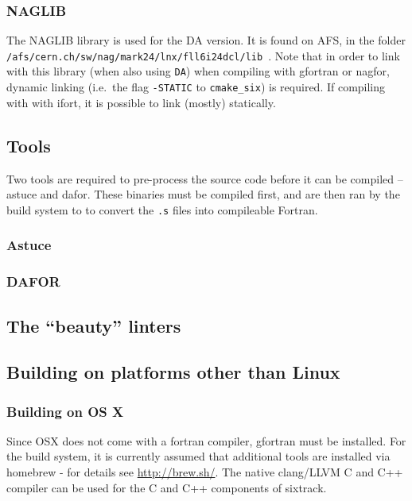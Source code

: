 \documentclass[english,BCOR=0mm,DIV=18]{scrartcl}
\begin{document}
\subsubsection{NAGLIB}
\label{sec:building:libs:naglib}
The NAGLIB library  is used for the DA version.
It is found on AFS, in the folder \texttt{/afs/cern.ch/sw/nag/mark24/lnx/fll6i24dcl/lib}~.
Note that in order to link with this library (when also using \texttt{DA}) when compiling with gfortran or nagfor, dynamic linking (i.e.\ the flag \texttt{-STATIC} to \texttt{cmake\_six}) is required.
If compiling with with ifort, it is possible to link (mostly) statically.

\subsection{Tools}

Two tools are required to pre-process the source code before it can be compiled -- astuce and dafor.
These binaries must be compiled first, and are then ran by the build system to to convert the \texttt{.s} files into compileable Fortran.

\subsubsection{Astuce}

\subsubsection{DAFOR}

\subsection{The ``beauty'' linters}

\subsection{Building on platforms other than Linux}

\subsubsection{Building on OS X}

Since OSX does not come with a fortran compiler, gfortran must be installed.
For the build system, it is currently assumed that additional tools are installed via homebrew - for details see \url{http://brew.sh/}.
The native clang/LLVM C and C++ compiler can be used for the C and C++ components of sixtrack.
\end{document}
